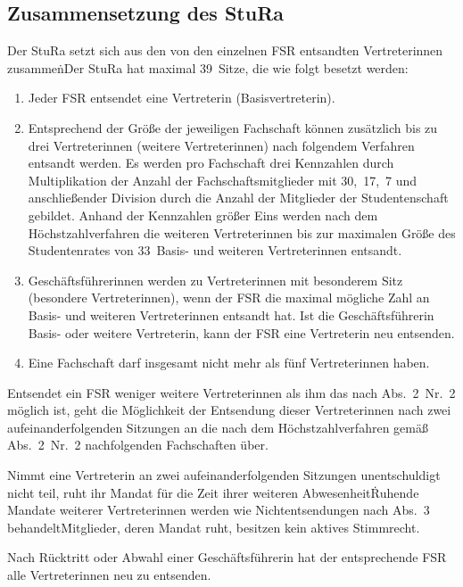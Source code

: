\begin{multicols}{2}
\section{Zusammensetzung des StuRa}

\Abs \Satz Der StuRa setzt sich aus den von den einzelnen FSR entsandten Vertreterinnen zusammen\.

\Abs \Satz Der StuRa hat maximal 39~Sitze, die wie folgt besetzt werden:
\begin{enumerate}
\item Jeder FSR entsendet eine Vertreterin (Basisvertreterin).
\item Entsprechend der Größe der jeweiligen Fachschaft können zusätzlich bis zu drei Vertreterinnen (weitere Vertreterinnen) nach folgendem Verfahren entsandt werden. Es werden pro Fachschaft drei Kennzahlen durch Multiplikation der Anzahl der Fachschaftsmitglieder mit 30,~17,~7 und anschließender Division durch die Anzahl der Mitglieder der Studentenschaft gebildet. Anhand der Kennzahlen größer Eins werden nach dem Höchstzahlverfahren die weiteren Vertreterinnen bis zur maximalen Größe des Studentenrates von 33~Basis- und weiteren Vertreterinnen entsandt.
\item Geschäftsführerinnen werden zu Vertreterinnen mit besonderem Sitz (besondere Vertreterinnen), wenn der FSR die maximal mögliche Zahl an Basis- und weiteren Vertreterinnen entsandt hat. Ist die Geschäftsführerin Basis- oder weitere Vertreterin, kann der FSR eine Vertreterin neu entsenden.
\item Eine Fachschaft darf insgesamt nicht mehr als fünf Vertreterinnen haben.
\end{enumerate}

\Abs \Satz Entsendet ein FSR weniger weitere Vertreterinnen als ihm das nach Abs.~2~Nr.~2 möglich ist, geht die Möglichkeit der Entsendung dieser Vertreterinnen nach zwei aufeinanderfolgenden Sitzungen an die nach dem Höchstzahlverfahren gemäß Abs.~2~Nr.~2 nachfolgenden Fachschaften über.

\Abs \Satz Nimmt eine Vertreterin an zwei aufeinanderfolgenden Sitzungen unentschuldigt nicht teil, ruht ihr Mandat für die Zeit ihrer weiteren Abwesenheit\. Ruhende Mandate weiterer Vertreterinnen werden wie Nichtentsendungen nach Abs.~3 behandelt\. Mitglieder, deren Mandat ruht, besitzen kein aktives Stimmrecht.

\Abs \Satz Nach Rücktritt oder Abwahl einer Geschäftsführerin hat der entsprechende FSR alle Vertreterinnen neu zu entsenden.


\end{multicols}
